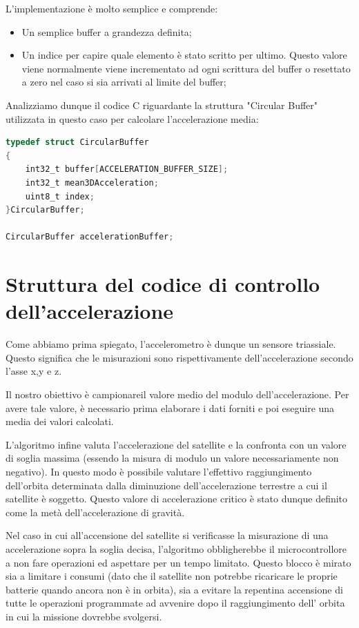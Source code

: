 \documentclass[LaM,binding=0.6cm,oneside]{../sapthesis}
\begin{document}
L'implementazione è molto semplice e comprende:
\begin{itemize}
    \item Un semplice buffer a grandezza definita;
    
    \item Un indice per capire quale elemento è stato scritto per ultimo. Questo valore viene normalmente viene incrementato ad ogni scrittura del buffer o resettato a zero nel caso si sia arrivati al limite del buffer;
\end{itemize}

\newline

Analizziamo dunque il codice C riguardante la struttura "Circular Buffer" utilizzata in questo caso per calcolare l'accelerazione media:

\begin{lstlisting}[language=C]
typedef struct CircularBuffer
{
    int32_t buffer[ACCELERATION_BUFFER_SIZE];
    int32_t mean3DAcceleration;
    uint8_t index;
}CircularBuffer;

CircularBuffer accelerationBuffer;
\end{lstlisting}

\section{Struttura del codice di controllo dell'accelerazione}
Come abbiamo prima spiegato, l'accelerometro è dunque un sensore triassiale. Questo significa che  le misurazioni sono rispettivamente dell'accelerazione secondo l'asse x,y e z.

Il nostro obiettivo è campionareil valore medio del modulo dell’accelerazione. Per avere tale valore, è necessario prima elaborare i dati forniti e poi eseguire una media dei valori calcolati. 

L’algoritmo infine valuta l’accelerazione del satellite e la confronta con un valore di soglia massima (essendo la misura di modulo un valore necessariamente non negativo).
In questo modo è possibile valutare l’effettivo raggiungimento dell’orbita determinata dalla diminuzione dell’accelerazione terrestre a cui il satellite è soggetto. Questo valore di accelerazione critico è stato dunque definito come la metà dell'accelerazione di gravità.

Nel caso in cui all’accensione del satellite si verificasse la misurazione di una accelerazione sopra la soglia decisa, l'algoritmo obbligherebbe il microcontrollore a non fare operazioni ed aspettare per un tempo limitato. Questo blocco è mirato sia a limitare i consumi (dato che il satellite non potrebbe ricaricare le proprie batterie quando ancora non è in orbita), sia a evitare la repentina accensione di tutte le operazioni programmate ad avvenire dopo il raggiungimento dell’ orbita in cui la missione dovrebbe svolgersi. 
\end{document}
